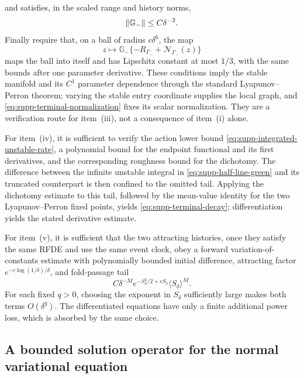 \begin{remark}
and satisfies, in the scaled range and history norms,
\[
 \left\lVert\mathbb G_-\right\rVert\le C\delta^{-2}.
\]
Finally require that, on a ball of radius \(c\delta^6\), the map
\[
 z\longmapsto
 \mathbb G_-\{-R_{\Gamma_-}+\mathcal N_{\Gamma_-}(z)\}
\]
maps the ball into itself and has Lipschitz constant at most \(1/3\), with the
same bounds after one parameter derivative.  These conditions imply the
stable manifold and its \(C^1\) parameter dependence through the standard
Lyapunov--Perron theorem; varying the stable entry coordinate supplies the
local graph, and \cref{eq:supp-terminal-normalization} fixes its scalar
normalization.  They are a verification route for item~\textup{(iii)}, not a
consequence of item~\textup{(i)} alone.

For item~\textup{(iv)}, it is sufficient to verify the action lower bound
\cref{eq:supp-integrated-unstable-rate}, a polynomial bound for the endpoint
functional and its first derivatives, and the corresponding roughness bound
for the dichotomy.  The difference between the infinite unstable integral in
\cref{eq:supp-half-line-green} and its truncated counterpart is then confined
to the omitted tail.  Applying the dichotomy estimate to this tail, followed
by the mean-value identity for the two Lyapunov--Perron fixed points, yields
\cref{eq:supp-terminal-decay}; differentiation yields the stated derivative
estimate.

For item~\textup{(v)}, it is sufficient that the two attracting histories,
once they satisfy the same RFDE and use the same event clock, obey a forward
variation-of-constants estimate with polynomially bounded initial
difference, attracting factor
\(e^{-c\log(1/\delta)/\delta}\), and fold-passage tail
\[
 C\delta^{-M}e^{-S_\delta^2/2+cS_\delta}
       \langle S_\delta\rangle^M.
\]
For each fixed \(q>0\), choosing the exponent in \(S_\delta\) sufficiently
large makes both terms \(O(\delta^q)\).  The differentiated equations have
only a finite
additional power loss, which is absorbed by the same choice.
\end{remark}

\subsection{A bounded solution operator for the normal variational equation}

